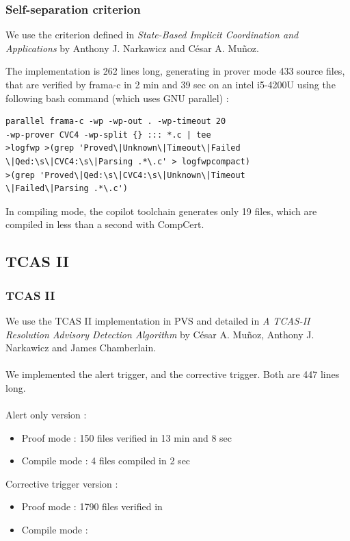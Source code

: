 \documentclass{beamer}
\begin{document}
\begin{frame}[fragile]
	\frametitle{Self-separation criterion}
	We use the criterion defined in \textit{State-Based Implicit Coordination
	and Applications} by Anthony J. Narkawicz and C\'esar A. Mu\~{n}oz.

	The implementation is 262 lines long, generating in prover mode 433 source files, that are verified by frama-c in 2 min and 39 sec on an intel i5-4200U using the following bash command (which uses GNU parallel) : 
\begin{lstlisting}
parallel frama-c -wp -wp-out . -wp-timeout 20 
-wp-prover CVC4 -wp-split {} ::: *.c | tee 
>logfwp >(grep 'Proved\|Unknown\|Timeout\|Failed
\|Qed:\s\|CVC4:\s\|Parsing .*\.c' > logfwpcompact) 
>(grep 'Proved\|Qed:\s\|CVC4:\s\|Unknown\|Timeout
\|Failed\|Parsing .*\.c')
\end{lstlisting}
	
	In compiling mode, the copilot toolchain generates only 19 files, which are compiled in less than a second with CompCert.
\end{frame}


\subsection{TCAS II}
\begin{frame}
	\tableofcontents[currentsubsection,sectionstyle=show/shaded,subsectionstyle=show/shaded/hide]
\end{frame}

\begin{frame}[fragile]
	\frametitle{TCAS II}
	We use the TCAS II implementation in PVS and detailed in \textit{A TCAS-II Resolution Advisory Detection Algorithm} by C\'esar A. Mu\~{n}oz, Anthony J. Narkawicz and James Chamberlain. \\~\\	
	We implemented the alert trigger, and the corrective trigger.
	Both are 447 lines long. \\~\\
	Alert only version :
\begin{itemize}
\item Proof mode : 150 files verified in 13 min and 8 sec
\item Compile mode : 4 files compiled in 2 sec
\end{itemize}
Corrective trigger version :
\begin{itemize}
\item Proof mode : 1790 files verified in 
\item Compile mode : 
\end{itemize}
	
\end{frame}
\end{document}
